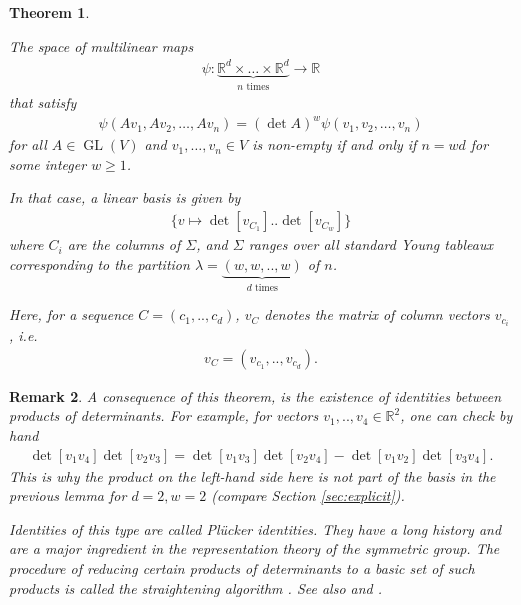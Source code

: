\documentclass{scrartcl}
\newtheorem{theorem}{Theorem}
\theoremstyle{plain}
\newtheorem{remark}[theorem]{Remark}
\theoremstyle{definition}
\newcommand{\R}{\mathbb{R}}
\newcommand{\1}[1]{1_{\{#1\}}}
\newcommand{\ds}{d} %
\begin{document}
\begin{theorem}
  \label{thm:linearBasis}

   The space of multilinear maps
   \begin{align*}
     \psi: \underbrace{\R^\ds \times \dots \times \R^\ds}_{n \text{ times}} \to \R
   \end{align*}
   that satisfy
   \begin{align*}
     \psi(A v_1, A v_2, \dots, A v_n) = (\det A)^w \psi(v_1, v_2, \dots, v_n)
   \end{align*}
   for all $A \in \operatorname{GL}(V)$ and $v_1, \dots, v_n \in V$
   is non-empty if and only if $n = w d$ for some integer $w \ge 1$.

  In that case, a linear basis is given by
  \begin{align*}
    \{ v \mapsto \det[ v_{C_1} ]  .. \det[ v_{C_w} ] \}
  \end{align*}
  where
  $C_i$ are the columns of $\Sigma$,
  and
  $\Sigma$ ranges over all standard Young tableaux corresponding to the partition $\lambda = \underbrace{(w, w, .., w)}_{d \text{ times}}$ of $n$.

  Here, for a sequence $C = (c_1,..,c_\ds)$, $v_C$ denotes the matrix
  of column vectors $v_{c_i}$, i.e.
  \begin{align*}
    v_C = (v_{c_1}, .., v_{c_\ds}).
  \end{align*}
\end{theorem}
\begin{remark}
  A consequence of this theorem,
  is the existence of identities between products of determinants.
  For example, for vectors $v_1, .., v_4 \in \R^2$, one can check by hand
  \begin{align*}
    \det[ v_1 v_4 ] \det[ v_2 v_3]
    =
    \det[ v_1 v_3 ] \det[ v_2 v_4]
    -
    \det[ v_1 v_2 ] \det[ v_3 v_4].
  \end{align*}
  This is why the product on the left-hand side here is not part of the basis in the previous lemma for $d=2, w=2$
  (compare Section \ref{sec:explicit}). 

  Identities of this type
  are called \emph{Pl\"ucker identities}.
  They have a long history and are a major ingredient in the representation theory of the symmetric group.
  The procedure of reducing certain products of determinants to a basic set of such products
  is called the \emph{straightening algorithm} \cite[Section 2.6]{bib:Sag2013}.
  See also 
  \cite{bib:Lec1993} and
  \cite{bib:SW1989}.
\end{remark}
\end{document}
